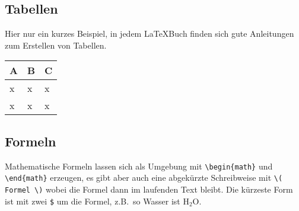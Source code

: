 % 

% 


\subsection{Tabellen}

Hier nur ein kurzes Beispiel, in jedem \LaTeX Buch finden sich gute Anleitungen zum Erstellen von Tabellen.

\begin{table}[h]
\begin{center}
\begin{tabular}{|l|l|l|}
	A & B & C \\\hline
	x & x & x \\
	x & x & x
\end{tabular}
\end{center}
\end{table}


\subsection{Formeln}

Mathematische Formeln lassen sich als Umgebung mit \verb|\begin{math}| und \verb|\end{math}| erzeugen, es gibt aber auch eine abgekürzte Schreibweise mit \verb|\( Formel \)| wobei die Formel dann im laufenden Text bleibt. Die kürzeste Form ist mit zwei \verb|$| um die Formel, z.B.~so Wasser ist H$_2$O.

